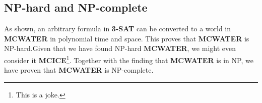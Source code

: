 \subsection{NP-hard and NP-complete}
As shown, an arbitrary formula in \textbf{3-SAT} can be converted to a world in \textbf{MCWATER} in polynomial time and space. This proves that \textbf{MCWATER} is NP-hard.\newline Given that we have found NP-hard \textbf{MCWATER}, we might even consider it \textbf{MCICE}\footnote{This is a joke.}.
\linebreak
\noindent Together with the finding that \textbf{MCWATER} is in NP, we have proven that \textbf{MCWATER} is NP-complete.

